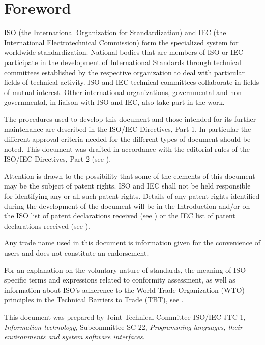 \chapter{Foreword}

ISO (the International Organization for Standardization) and IEC (the
International Electrotechnical Commission) form the specialized system for
worldwide standardization. National bodies that are members of ISO or IEC
participate in the development of International Standards through technical
committees established by the respective organization to deal with particular
fields of technical activity. ISO and IEC technical committees collaborate in
fields of mutual interest. Other international organizations, governmental and
non-governmental, in liaison with ISO and IEC, also take part in the work.

The procedures used to develop this document and those intended for its further
maintenance are described in the ISO/IEC Directives, Part 1. In particular the
different approval criteria needed for the different types of document should
be noted. This document was drafted in accordance with the editorial rules of
the ISO/IEC Directives, Part 2
(see \href{http://www.iso.org/directives}{}).

Attention is drawn to the possibility that some of the elements of this
document may be the subject of patent rights. ISO and IEC shall not be held
responsible for identifying any or all such patent rights. Details of any
patent rights identified during the development of the document will be in the
Introduction and/or on the ISO list of patent declarations received
(see \href{http://www.iso.org/patents}{})
or the IEC list of patent declarations received
(see \href{http://patents.iec.ch}{}).

Any trade name used in this document is information given for the convenience
of users and does not constitute an endorsement.

For an explanation on
the voluntary nature of standards,
the meaning of ISO specific terms and expressions related
to conformity assessment, as well as information about ISO's adherence
to the World Trade Organization (WTO) principles
in the Technical Barriers to Trade (TBT), see
\href{http://www.iso.org/iso/foreword.html}{}.

This document was prepared by
Joint Technical Committee ISO/IEC JTC 1, \textit{Information technology},
Subcommittee SC 22, \textit{Programming languages, their environments and system software interfaces}.


